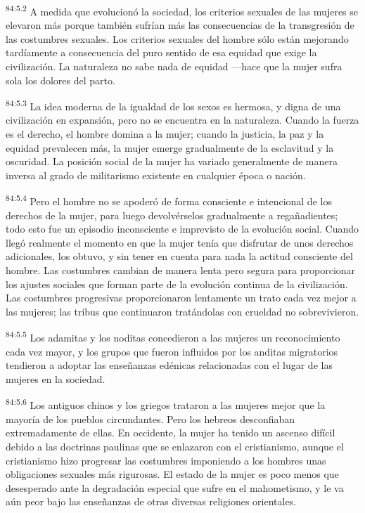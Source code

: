 \par
\textsuperscript{84:5.2} A medida que evolucionó la sociedad, los criterios sexuales de las mujeres se elevaron más porque también sufrían más las consecuencias de la transgresión de las costumbres sexuales. Los criterios sexuales del hombre sólo están mejorando tardíamente a consecuencia del puro sentido de esa equidad que exige la civilización. La naturaleza no sabe nada de equidad ---hace que la mujer sufra sola los dolores del parto.

\par
\textsuperscript{84:5.3} La idea moderna de la igualdad de los sexos es hermosa, y digna de una civilización en expansión, pero no se encuentra en la naturaleza. Cuando la fuerza es el derecho, el hombre domina a la mujer; cuando la justicia, la paz y la equidad prevalecen más, la mujer emerge gradualmente de la esclavitud y la oscuridad. La posición social de la mujer ha variado generalmente de manera inversa al grado de militarismo existente en cualquier época o nación.

\par
\textsuperscript{84:5.4} Pero el hombre no se apoderó de forma consciente e intencional de los derechos de la mujer, para luego devolvérselos gradualmente a regañadientes; todo esto fue un episodio inconsciente e imprevisto de la evolución social. Cuando llegó realmente el momento en que la mujer tenía que disfrutar de unos derechos adicionales, los obtuvo, y sin tener en cuenta para nada la actitud consciente del hombre. Las costumbres cambian de manera lenta pero segura para proporcionar los ajustes sociales que forman parte de la evolución continua de la civilización. Las costumbres progresivas proporcionaron lentamente un trato cada vez mejor a las mujeres; las tribus que continuaron tratándolas con crueldad no sobrevivieron.

\par
\textsuperscript{84:5.5} Los adamitas y los noditas concedieron a las mujeres un reconocimiento cada vez mayor, y los grupos que fueron influidos por los anditas migratorios tendieron a adoptar las enseñanzas edénicas relacionadas con el lugar de las mujeres en la sociedad.

\par
\textsuperscript{84:5.6} Los antiguos chinos y los griegos trataron a las mujeres mejor que la mayoría de los pueblos circundantes. Pero los hebreos desconfiaban extremadamente de ellas. En occidente, la mujer ha tenido un ascenso difícil debido a las doctrinas paulinas que se enlazaron con el cristianismo, aunque el cristianismo hizo progresar las costumbres imponiendo a los hombres unas obligaciones sexuales más rigurosas. El estado de la mujer es poco menos que desesperado ante la degradación especial que sufre en el mahometismo, y le va aún peor bajo las enseñanzas de otras diversas religiones orientales.


